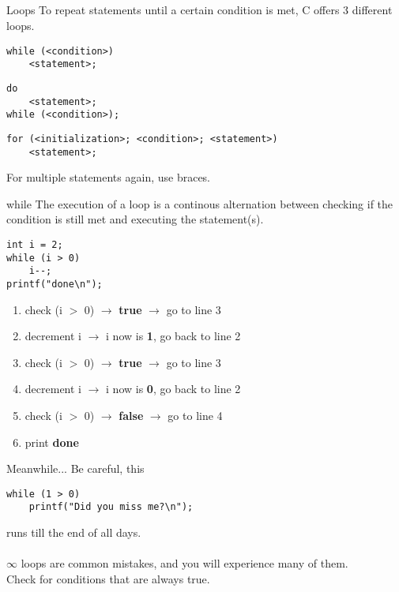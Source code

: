 \subsection{}
\begin{frame}[fragile]{Loops}
	To repeat statements until a certain condition is met, C offers 3 different loops.
	\begin{lstlisting}[numbers=none]
while (<condition>)
	<statement>;
\end{lstlisting}
	\begin{lstlisting}[numbers=none]
do
	<statement>;
while (<condition>);
\end{lstlisting}
	\begin{lstlisting}[numbers=none]
for (<initialization>; <condition>; <statement>)
	<statement>;
\end{lstlisting}
	For multiple statements again, use braces.
\end{frame}
\begin{frame}[fragile]{while}
	The execution of a loop is a continous alternation between checking if the condition is still met and executing the statement(s).
	\begin{lstlisting}
int i = 2;
while (i > 0)
	i--;
printf("done\n");
\end{lstlisting}
	\begin{enumerate}[<+(1)->]
		\item check (i $>$ 0) $\rightarrow$ \textbf{true} $\rightarrow$ go to line 3
		\item decrement i $\rightarrow$ i now is \textbf{1}, go back to line 2
		\item check (i $>$ 0) $\rightarrow$ \textbf{true} $\rightarrow$ go to line 3
		\item decrement i $\rightarrow$ i now is \textbf{0}, go back to line 2
		\item check (i $>$ 0) $\rightarrow$ \textbf{false} $\rightarrow$ go to line 4
		\item print \textbf{done}
	\end{enumerate}
\end{frame}
\begin{frame}[fragile]{Meanwhile...}
	Be careful, this
	\begin{lstlisting}[numbers=none]
while (1 > 0)
	printf("Did you miss me?\n");
\end{lstlisting}
runs till the end of all days.\\
\ \\$\infty$ loops are common mistakes, and you will experience many of them.\\
Check for conditions that are always true.
\end{frame}
